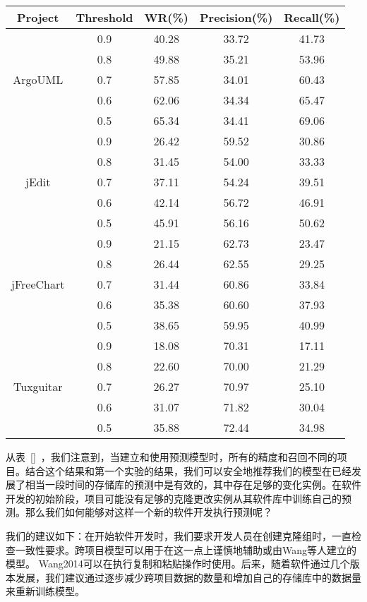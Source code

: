 \begin{table}[htbp]
\vspace{0.5em}\centering\wuhao
\begin{tabular}{ccccc}
\toprule[1.5pt]
{\textbf{Project}}&{\textbf{Threshold}}&{\textbf{WR(\%)}}&{\textbf{Precision(\%)}}&{\textbf{Recall(\%)}}\\

\midrule[1pt]
\multirow{5}{*}{ArgoUML}
&0.9&	40.28&	33.72&	41.73\\
&0.8&	49.88&	35.21&	53.96\\
&0.7&	57.85&	34.01&	60.43\\
&0.6&	62.06&	34.34&	65.47\\
&0.5&	65.34&	34.41&	69.06\\
\hline
\multirow{5}{*}{jEdit}
&0.9&	26.42&	59.52&	30.86\\
&0.8&	31.45&	54.00&	33.33\\
&0.7&	37.11&	54.24&	39.51\\
&0.6&	42.14&	56.72&	46.91\\
&0.5&	45.91&	56.16&	50.62\\
\hline
\multirow{5}{*}{jFreeChart}
&0.9&	21.15&	62.73&	23.47\\
&0.8&	26.44&	62.55&	29.25\\
&0.7&	31.44&	60.86&	33.84\\
&0.6&	35.38&	60.60&	37.93\\
&0.5&	38.65&	59.95&	40.99\\
\hline
\multirow{5}{*}{Tuxguitar}
&0.9&	18.08&	70.31&	17.11\\
&0.8&	22.60&	70.00&	21.29\\
&0.7&	26.27&	70.97&	25.10\\
&0.6&	31.07&	71.82&	30.04\\
&0.5&	35.88&	72.44&	34.98\\
\bottomrule[1.5pt]
\end{tabular}
\end{table}

从表~\ref{}~，我们注意到，当建立和使用预测模型时，所有的精度和召回不同的项目。结合这个结果和第一个实验的结果，我们可以安全地推荐我们的模型在已经发展了相当一段时间的存储库的预测中是有效的，其中存在足够的变化实例。在软件开发的初始阶段，项目可能没有足够的克隆更改实例从其软件库中训练自己的预测。那么我们如何能够对这样一个新的软件开发执行预测呢？

我们的建议如下：在开始软件开发时，我们要求开发人员在创建克隆组时，一直检查一致性要求。跨项目模型可以用于在这一点上谨慎地辅助或由Wang等人建立的模型。 \cite{} {Wang2014}可以在执行复制和粘贴操作时使用。后来，随着软件通过几个版本发展，我们建议通过逐步减少跨项目数据的数量和增加自己的存储库中的数据量来重新训练模型。

